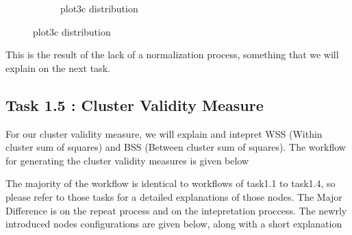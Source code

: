 \documentclass[11pt]{article}
\begin{document}
\begin{figure}[H]
\begin{subfigure}{0.4\textwidth}
					\caption{plot3c distribution}
					\label{fig:third}
				\end{subfigure}	
				\label{fig:figures}
			\end{figure}
			\fi
			 This is the result of the lack of a normalization process, something that we will explain on the next task.
		\subsection*{Task 1.5 : Cluster Validity Measure}
			For our cluster validity measure, we will explain and intepret WSS (Within cluster sum of squares) and BSS (Between cluster sum of squares). The workflow for generating the cluster validity measures is given below

			The majority of the workflow is identical to workflows of task1.1 to task1.4, so please refer to those tasks for a detailed explanations of those nodes. The Major Difference is on the repeat process and on the intepretation proccess. The newrly introduced nodes configurations are given below, along with a short explanation
			\iffalse
\end{document}
